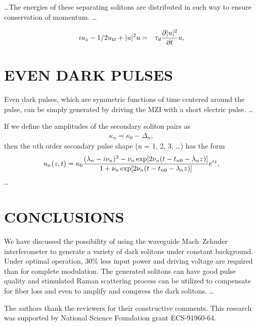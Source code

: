\ldots The energies of these
separating solitons are distributed in such way to ensure conservation of
momentum.                                             \ldots

\begin{eqnarray}
iu_z - {1/2}u_{tt}+|u|^2u &=& \tau_d{\partial |u|^2 \over \partial t}u,
\label{E12}
\end{eqnarray}

\section{EVEN  DARK PULSES}
\label{EDP}
Even dark pulses,\cite{KA,WA} which are symmetric functions of time
centered around the pulse, can be simply generated by driving
the MZI with a short electric pulse. \ldots

If we define the amplitudes of the secondary soliton pairs as
\begin{eqnarray}
\kappa_n  =  \kappa_0 - \Delta_{n} ,  \label{E16}
\end{eqnarray}
then the $n$th order secondary pulse shape (n = 1, 2, 3, \ldots )
has the form
\begin{eqnarray}
u_n (z,t)  =  \kappa_{0}{(\lambda_n - i \nu_n )^2 - \nu_n
\,{\rm exp} [ 2 \nu_n (t-t_{n0} - \lambda_{n} z)] \over  1 +
\nu_n\, {\rm exp} [ 2 \nu_n (t-t_{n0} - \lambda_n z)]} e^{iz},
\label{E17}
\end{eqnarray}
\ldots

\section{CONCLUSIONS}
We have discussed the possibility of using the waveguide Mach--Zehnder
interferometer to generate a variety of dark solitons under constant
background.  Under optimal
operation,  30\% less input power and driving voltage are required
than for complete modulation.  The
generated solitons can have good pulse quality and stimulated Raman
scattering process can be utilized to compensate for fiber loss and even
to amplify and compress the dark solitons. \ldots


\acknowledgments

The authors  thank the reviewers for their constructive comments.
This research was supported by National Science Foundation grant
ECS-91960-64.

